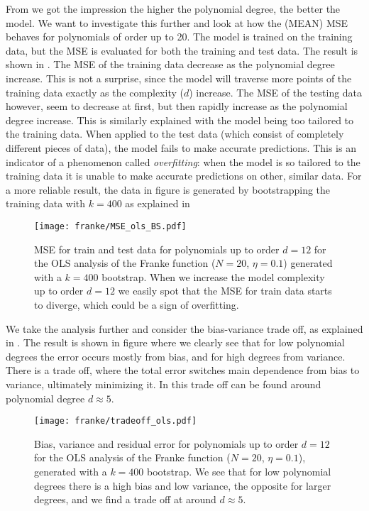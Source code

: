             From  we got the impression the higher the polynomial degree, the better the model. We want to investigate this further and look at how the (MEAN) MSE behaves for polynomials of order up to 20. The model is trained on the training data, but the MSE is evaluated for both the training and test data. The result is shown in . The MSE of the training data decrease as the polynomial degree increase. This is not a surprise, since the model will traverse more points of the training data exactly as the complexity ($d$) increase. The MSE of the testing data however, seem to decrease at first, but then rapidly increase as the polynomial degree increase. This is similarly explained with the model being too tailored to the training data. When applied to the test data (which consist of completely different pieces of data), the model fails to make accurate predictions. This is an indicator of a phenomenon called \textit{overfitting}: when the model is so tailored to the training data it is unable to make accurate predictions on other, similar data. For a more reliable result, the data in figure  is generated by bootstrapping the training data with $k=400$ as explained in 

            \begin{figure}
                \texttt{[image: franke/MSE\_ols\_BS.pdf]}
                \caption{MSE for train and test data for polynomials up to order $d=12$ for the OLS analysis of the Franke function ($N=20$, $\eta=0.1$) generated with a $k=400$ bootstrap. When we increase the model complexity  up to order $d=12$ we easily  spot that the MSE for train data starts to diverge, which could be a sign of overfitting. }
                \label{fig:model_complexity_ols}
            \end{figure}

            We take the analysis further and consider the bias-variance trade off, as explained in . The result is shown in figure   where we clearly see that for low polynomial degrees the error occurs mostly from bias, and for high degrees from  variance. There is a trade off, where the  total error switches  main dependence from bias to variance, ultimately minimizing it. In  this  trade off can be found around polynomial degree $d\approx 5$.

            
            \begin{figure}
                \texttt{[image: franke/tradeoff\_ols.pdf]}
                \caption{Bias, variance and residual error for polynomials up to order $d=12$ for the OLS analysis of the Franke function ($N=20$, $\eta=0.1$), generated with a $k=400$ bootstrap. We see that for low polynomial degrees there is a high bias and low variance, the opposite for larger degrees, and we find a trade off at around $d\approx 5$.}
                \label{fig:bias_variance_ols}
            \end{figure}
            
